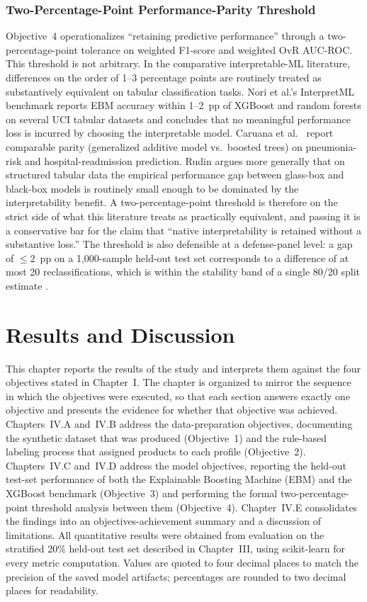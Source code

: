 \documentclass[journal]{./IEEE/IEEEtran}
\begin{document}
\subsubsection{Two-Percentage-Point Performance-Parity Threshold}

Objective~4 operationalizes ``retaining predictive performance'' through a two-percentage-point tolerance on weighted F1-score and weighted OvR AUC-ROC. This threshold is not arbitrary. In the comparative interpretable-ML literature, differences on the order of 1--3 percentage points are routinely treated as substantively equivalent on tabular classification tasks. Nori et al.'s \cite{ref15} InterpretML benchmark reports EBM accuracy within 1--2~pp of XGBoost and random forests on several UCI tabular datasets and concludes that no meaningful performance loss is incurred by choosing the interpretable model. Caruana et al.\ \cite{ref50} report comparable parity (generalized additive model vs.\ boosted trees) on pneumonia-risk and hospital-readmission prediction. Rudin \cite{ref51} argues more generally that on structured tabular data the empirical performance gap between glass-box and black-box models is routinely small enough to be dominated by the interpretability benefit. A two-percentage-point threshold is therefore on the strict side of what this literature treats as practically equivalent, and passing it is a conservative bar for the claim that ``native interpretability is retained without a substantive loss.'' The threshold is also defensible at a defense-panel level: a gap of $\leq 2$~pp on a 1{,}000-sample held-out test set corresponds to a difference of at most 20 reclassifications, which is within the stability band of a single 80/20 split estimate \cite{ref68}.


\section{Results and Discussion}
This chapter reports the results of the study and interprets them against the four objectives stated in Chapter~I. The chapter is organized to mirror the sequence in which the objectives were executed, so that each section answers exactly one objective and presents the evidence for whether that objective was achieved. Chapters~IV.A and~IV.B address the data-preparation objectives, documenting the synthetic dataset that was produced (Objective~1) and the rule-based labeling process that assigned products to each profile (Objective~2). Chapters~IV.C and~IV.D address the model objectives, reporting the held-out test-set performance of both the Explainable Boosting Machine (EBM) and the XGBoost benchmark (Objective~3) and performing the formal two-percentage-point threshold analysis between them (Objective~4). Chapter~IV.E consolidates the findings into an objectives-achievement summary and a discussion of limitations. All quantitative results were obtained from evaluation on the stratified 20\% held-out test set described in Chapter~III, using scikit-learn \cite{ref74} for every metric computation. Values are quoted to four decimal places to match the precision of the saved model artifacts; percentages are rounded to two decimal places for readability.
\end{document}
